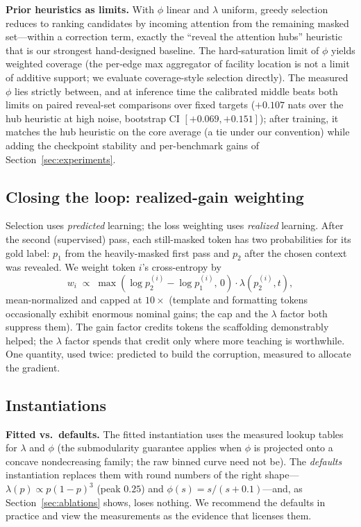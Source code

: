 \documentclass{article} %
\begin{document}
\textbf{Prior heuristics as limits.} With $\phi$ linear and $\lambda$ uniform, greedy selection reduces to ranking candidates by incoming attention from the remaining masked set---within a correction term, exactly the ``reveal the attention hubs'' heuristic that is our strongest hand-designed baseline. The hard-saturation limit of $\phi$ yields weighted coverage (the per-edge max aggregator of facility location is not a limit of additive support; we evaluate coverage-style selection directly). The measured $\phi$ lies strictly between, and at inference time the calibrated middle beats both limits on paired reveal-set comparisons over fixed targets ($+0.107$ nats over the hub heuristic at high noise, bootstrap CI $[+0.069, +0.151]$); after training, it matches the hub heuristic on the core average (a tie under our convention) while adding the checkpoint stability and per-benchmark gains of Section~\ref{sec:experiments}.

\subsection{Closing the loop: realized-gain weighting}

Selection uses \emph{predicted} learning; the loss weighting uses \emph{realized} learning. After the second (supervised) pass, each still-masked token has two probabilities for its gold label: $p_1$ from the heavily-masked first pass and $p_2$ after the chosen context was revealed. We weight token $i$'s cross-entropy by
\begin{equation}
w_i \;\propto\; \max(\log p_2^{(i)} - \log p_1^{(i)},\, 0) \cdot \lambda(p_2^{(i)}, t),
\end{equation}
mean-normalized and capped at $10\times$ (template and formatting tokens occasionally exhibit enormous nominal gains; the cap and the $\lambda$ factor both suppress them). The gain factor credits tokens the scaffolding demonstrably helped; the $\lambda$ factor spends that credit only where more teaching is worthwhile. One quantity, used twice: predicted to build the corruption, measured to allocate the gradient.

\subsection{Instantiations}
\label{sec:instantiations}

\textbf{Fitted vs.\ defaults.} The fitted instantiation uses the measured lookup tables for $\lambda$ and $\phi$ (the submodularity guarantee applies when $\phi$ is projected onto a concave nondecreasing family; the raw binned curve need not be). The \emph{defaults} instantiation replaces them with round numbers of the right shape---$\lambda(p) \propto p(1-p)^3$ (peak $0.25$) and $\phi(s) = s/(s+0.1)$---and, as Section~\ref{sec:ablations} shows, loses nothing. We recommend the defaults in practice and view the measurements as the evidence that licenses them.
\end{document}
